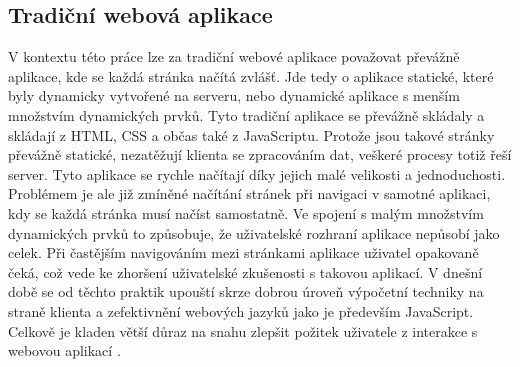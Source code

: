         \subsection{Tradiční webová aplikace}
V kontextu této práce lze za tradiční webové aplikace považovat převážně aplikace, kde se každá stránka načítá zvlášť. Jde tedy o aplikace statické, které byly dynamicky vytvořené na serveru, nebo dynamické aplikace s menším množstvím dynamických prvků. Tyto tradiční aplikace se převážně skládaly a skládají z HTML, CSS a občas také z JavaScriptu. Protože jsou takové stránky převážně statické, nezatěžují klienta se zpracováním dat, veškeré procesy totiž řeší server. Tyto aplikace se rychle načítají díky jejich malé velikosti a jednoduchosti. Problémem je ale již zmíněné načítání stránek při navigaci v samotné aplikaci, kdy se každá stránka musí načíst samostatně. Ve spojení s malým množstvím dynamických prvků to způsobuje, že uživatelské rozhraní aplikace nepůsobí jako celek. Při častějším navigováním mezi stránkami aplikace uživatel opakovaně čeká, což vede ke zhoršení uživatelské zkušenosti s takovou aplikací. V dnešní době se od těchto praktik upouští skrze dobrou úroveň výpočetní techniky na straně klienta a zefektivnění webových jazyků jako je především JavaScript. Celkově je kladen větší důraz na snahu zlepšit požitek uživatele z interakce s webovou aplikací \cite{spadevelopment}.

